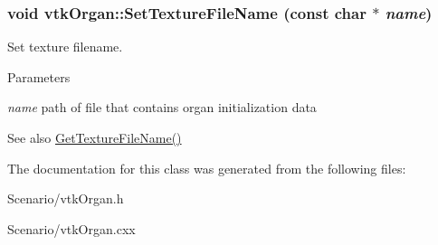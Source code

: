 \hypertarget{classvtkOrgan_af19a32e071ae5f9c9848b2ad7088d0c1}{
\subsubsection[{SetTextureFileName}]{\setlength{\rightskip}{0pt plus 5cm}void vtkOrgan::SetTextureFileName (const char $\ast$ {\em name})}}
\label{classvtkOrgan_af19a32e071ae5f9c9848b2ad7088d0c1}


Set texture filename. 


\begin{DoxyParams}{Parameters}
\item[{\em name}]path of file that contains organ initialization data \end{DoxyParams}
\begin{DoxySeeAlso}{See also}
\hyperlink{classvtkOrgan_aaec0735181654c6500d0767eed30b94d}{GetTextureFileName()} 
\end{DoxySeeAlso}


The documentation for this class was generated from the following files:\begin{DoxyCompactItemize}
\item 
Scenario/vtkOrgan.h\item 
Scenario/vtkOrgan.cxx\end{DoxyCompactItemize}
